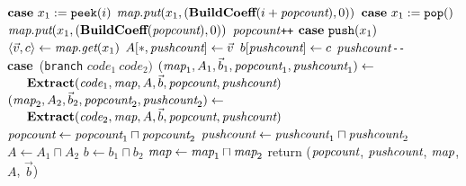 \begin{algorithm}
\begin{algorithmic}
\UND
\STATE \vspace{-6pt}
\STATE $\mbox{\bf case}~x_1 := \mbox{\tt peek}(i)$
\IND
\STATE $\mbox{\it map}.\mbox{\it put}(x_1, (\mbox{\bf BuildCoeff}(i + \mbox{\it popcount}), 0))$
\UND
\STATE \vspace{-6pt}
\STATE $\mbox{\bf case}~x_1 := \mbox{\tt pop}()$
\IND
\STATE $\mbox{\it map}.\mbox{\it put}(x_1, (\mbox{\bf BuildCoeff}(\mbox{\it popcount}), 0))$
\STATE $\mbox{\it popcount}$\verb|++|
\UND
\STATE \vspace{-6pt}
\STATE $\mbox{\bf case}~\mbox{\tt push}(x_1)$
\IND
\STATE $\langle{\vec v}, {c}\rangle \leftarrow \mbox{\it map}.\mbox{\it get}(x_1)$
\STATE $A[*, \mbox{\it pushcount}] \leftarrow \vec v$
\STATE $b[\mbox{\it pushcount}] \leftarrow c$
\STATE $\mbox{\it pushcount}$\verb|--|
\UND
\STATE \vspace{-6pt}
\STATE \mbox{\bf case}~({\tt branch} $code_1~code_2)$
\IND
\STATE $(\mbox{\it map}_1, A_1, {\vec b_1}, \mbox{\it popcount}_1, \mbox{\it pushcount}_1) \leftarrow$ \\
\verb+   +${\mbox{\bf Extract}}(\mbox{\it code}_1, \mbox{\it map}, A, {\vec b}, \mbox{\it popcount}, \mbox{\it pushcount})$
\STATE $(\mbox{\it map}_2, A_2, {\vec b_2}, \mbox{\it popcount}_2, \mbox{\it pushcount}_2) \leftarrow$ \\ 
\verb+   +${\mbox{\bf Extract}}(\mbox{\it code}_2, \mbox{\it map}, A, {\vec b}, \mbox{\it popcount}, \mbox{\it pushcount})$
\STATE $\mbox{\it popcount} \leftarrow \mbox{\it popcount}_1 \sqcap \mbox{\it popcount}_2$
\STATE $\mbox{\it pushcount} \leftarrow \mbox{\it pushcount}_1 \sqcap \mbox{\it pushcount}_2$
\STATE $A \leftarrow A_1 \sqcap A_2$
\STATE $b \leftarrow b_1 \sqcap b_2$
\STATE $\mbox{\it map} \leftarrow \mbox{\it map}_1 \sqcap \mbox{\it map}_2$
\UND
\UND %
\ENDFOR
\STATE return ($\mbox{\it popcount}$, $\mbox{\it pushcount}$, $\mbox{\it map}$, $A$, ${\vec b}$)
\end{algorithmic}
\end{algorithm}
